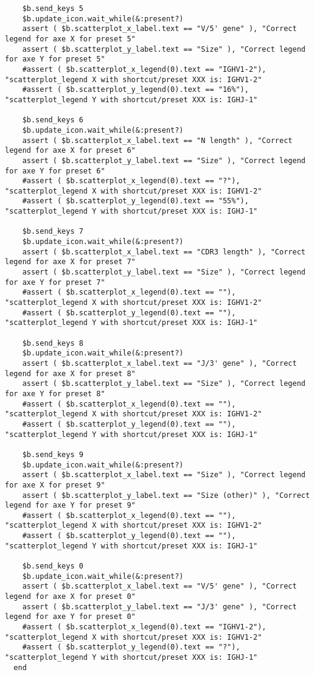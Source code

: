 \begin{verbatim}
    $b.send_keys 5
    $b.update_icon.wait_while(&:present?)
    assert ( $b.scatterplot_x_label.text == "V/5' gene" ), "Correct legend for axe X for preset 5"
    assert ( $b.scatterplot_y_label.text == "Size" ), "Correct legend for axe Y for preset 5"
    #assert ( $b.scatterplot_x_legend(0).text == "IGHV1-2"), "scatterplot_legend X with shortcut/preset XXX is: IGHV1-2"
    #assert ( $b.scatterplot_y_legend(0).text == "16%"), "scatterplot_legend Y with shortcut/preset XXX is: IGHJ-1"

    $b.send_keys 6
    $b.update_icon.wait_while(&:present?)
    assert ( $b.scatterplot_x_label.text == "N length" ), "Correct legend for axe X for preset 6"
    assert ( $b.scatterplot_y_label.text == "Size" ), "Correct legend for axe Y for preset 6"
    #assert ( $b.scatterplot_x_legend(0).text == "?"), "scatterplot_legend X with shortcut/preset XXX is: IGHV1-2"
    #assert ( $b.scatterplot_y_legend(0).text == "55%"), "scatterplot_legend Y with shortcut/preset XXX is: IGHJ-1"

    $b.send_keys 7
    $b.update_icon.wait_while(&:present?)
    assert ( $b.scatterplot_x_label.text == "CDR3 length" ), "Correct legend for axe X for preset 7"
    assert ( $b.scatterplot_y_label.text == "Size" ), "Correct legend for axe Y for preset 7"
    #assert ( $b.scatterplot_x_legend(0).text == ""), "scatterplot_legend X with shortcut/preset XXX is: IGHV1-2"
    #assert ( $b.scatterplot_y_legend(0).text == ""), "scatterplot_legend Y with shortcut/preset XXX is: IGHJ-1"

    $b.send_keys 8
    $b.update_icon.wait_while(&:present?)
    assert ( $b.scatterplot_x_label.text == "J/3' gene" ), "Correct legend for axe X for preset 8"
    assert ( $b.scatterplot_y_label.text == "Size" ), "Correct legend for axe Y for preset 8"
    #assert ( $b.scatterplot_x_legend(0).text == ""), "scatterplot_legend X with shortcut/preset XXX is: IGHV1-2"
    #assert ( $b.scatterplot_y_legend(0).text == ""), "scatterplot_legend Y with shortcut/preset XXX is: IGHJ-1"

    $b.send_keys 9
    $b.update_icon.wait_while(&:present?)
    assert ( $b.scatterplot_x_label.text == "Size" ), "Correct legend for axe X for preset 9"
    assert ( $b.scatterplot_y_label.text == "Size (other)" ), "Correct legend for axe Y for preset 9"
    #assert ( $b.scatterplot_x_legend(0).text == ""), "scatterplot_legend X with shortcut/preset XXX is: IGHV1-2"
    #assert ( $b.scatterplot_y_legend(0).text == ""), "scatterplot_legend Y with shortcut/preset XXX is: IGHJ-1"

    $b.send_keys 0
    $b.update_icon.wait_while(&:present?)
    assert ( $b.scatterplot_x_label.text == "V/5' gene" ), "Correct legend for axe X for preset 0"
    assert ( $b.scatterplot_y_label.text == "J/3' gene" ), "Correct legend for axe Y for preset 0"
    #assert ( $b.scatterplot_x_legend(0).text == "IGHV1-2"), "scatterplot_legend X with shortcut/preset XXX is: IGHV1-2"
    #assert ( $b.scatterplot_y_legend(0).text == "?"), "scatterplot_legend Y with shortcut/preset XXX is: IGHJ-1"
  end
\end{verbatim}

